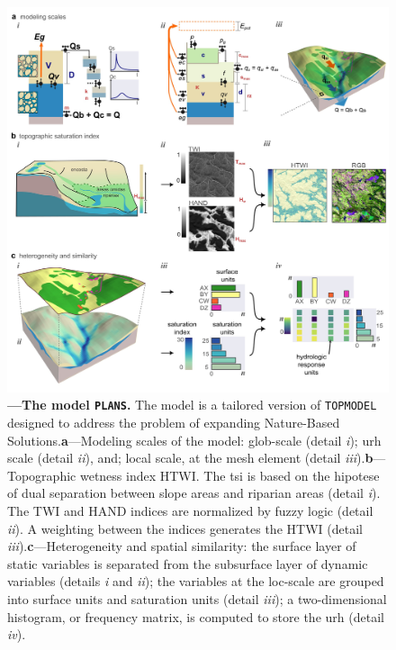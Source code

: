 \documentclass[./main_en.tex]{subfiles}
\begin{document}
\begin{figure}[t!] 
\centering				
\includegraphics[width=0.98\linewidth]{figs/fig_plans_en.jpg}		
\caption[The \gls{model} \texttt{PLANS}]
{\textbf{---\;The \gls{model} \texttt{PLANS}.} The \gls{model} is a tailored version of \texttt{TOPMODEL} designed to address the problem of expanding Nature-Based Solutions.\;\textbf{a}\;---\;Modeling scales of the \gls{model}: \gls{glob-scale} (detail \textrm{\textit{i}}); \gls{urh} scale (detail \textrm{\textit{ii}}), and; local scale, at the mesh element (detail \textrm{\textit{iii}}).\;\textbf{b}\;---\;Topographic wetness index HTWI. The \gls{tsi} is based on the \gls{hipotese} of dual separation between slope areas and riparian areas (detail \textrm{\textit{i}}). The TWI and HAND indices are normalized by fuzzy logic (detail \textrm{\textit{ii}}). A weighting between the indices generates the HTWI (detail \textrm{\textit{iii}}).\;\textbf{c}\;---\;Heterogeneity and spatial similarity: the surface layer of static variables is separated from the subsurface layer of dynamic variables (details \textrm{\textit{i}} and \textrm{\textit{ii}}); the variables at the \gls{loc-scale} are grouped into surface units and saturation units (detail \textrm{\textit{iii}}); a two-dimensional histogram, or frequency matrix, is computed to store the \gls{urh} (detail \textrm{\textit{iv}}).
}
\label{fig:hydro:plans} 		
\end{figure}
\end{document}
